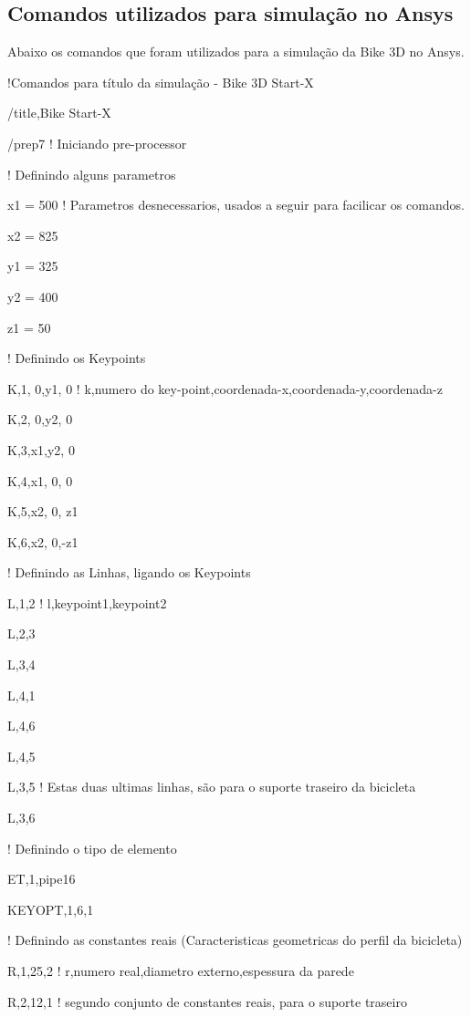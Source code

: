 \begin{anexosenv}

\partanexos

\chapter{ Comandos utilizados para simulação no Ansys}

Abaixo os comandos que foram utilizados para a simulação da Bike 3D no Ansys.

!Comandos para título da simulação - Bike 3D Start-X

/title,Bike Start-X

/prep7 ! Iniciando pre-processor

! Definindo alguns parametros

x1 = 500 ! Parametros desnecessarios, usados a seguir para facilicar os comandos.		

x2 = 825 

y1 = 325 

y2 = 400 

z1 = 50 

! Definindo os Keypoints 

K,1, 0,y1, 0 ! k,numero do key-point,coordenada-x,coordenada-y,coordenada-z

K,2, 0,y2, 0 

K,3,x1,y2, 0 

K,4,x1, 0, 0 

K,5,x2, 0, z1 

K,6,x2, 0,-z1 

! Definindo as Linhas, ligando os Keypoints 

L,1,2 ! l,keypoint1,keypoint2 

L,2,3 

L,3,4 

L,4,1 

L,4,6 

L,4,5 

L,3,5 ! Estas duas ultimas linhas, são para o suporte traseiro da bicicleta

L,3,6 

! Definindo o tipo de elemento 

ET,1,pipe16 

KEYOPT,1,6,1 

! Definindo as constantes reais (Caracteristicas geometricas do perfil da bicicleta)

R,1,25,2 ! r,numero real,diametro externo,espessura da parede

R,2,12,1 ! segundo conjunto de constantes reais, para o suporte traseiro


\end{anexosenv}
